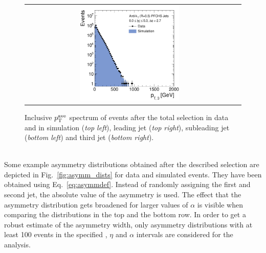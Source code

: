 \begin{figure}[!tp]
\begin{tabular}{cc}
                \includegraphics[width=0.49\textwidth]{figures/Jet3Pt__AfterAsymmHistos.pdf}

  \end{tabular}
  \caption{Inclusive $p_{\text{T}}^\mathrm{ave}$ spectrum of events after the total selection in data and in simulation (\textit{top left}), leading jet \pt (\textit{top right}), subleading jet \pt (\textit{bottom left}) and third jet \pt (\textit{bottom right}).}
  \label{fig:ptave_spec}
\end{figure}
\\
Some example asymmetry distributions obtained after the described selection are depicted in Fig.~\ref{fig:asymm_dists} for data and simulated events. They have been obtained using Eq.~\ref{eq:asymmdef}. Instead of randomly assigning the first and second jet, the absolute value of the asymmetry is used. The effect that the asymmetry distribution gets broadened for larger values of $\alpha$ is visible when comparing the distributions in the top and the bottom row. In order to get a robust estimate of the asymmetry width, only asymmetry distributions with at least 100 events in the specified \ptave, $\eta$ and $\alpha$ intervals are considered for the analysis. 
